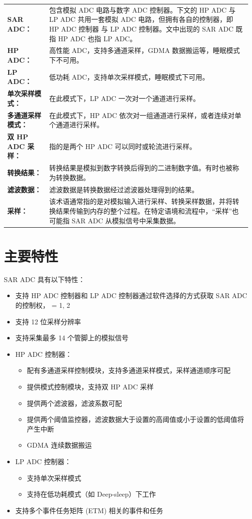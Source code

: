 \documentclass[main\_\_CN.tex]{subfiles}
\begin{document}
\begin{longtable}{ R{4cm} p{11cm} }
\textbf{SAR ADC：} & 包含模拟 ADC 电路与数字 ADC 控制器。下文的 HP ADC 与 LP ADC 共用一套模拟 ADC 电路，但拥有各自的控制器，即 HP ADC 控制器 与 LP ADC 控制器。文中出现的 SAR ADC 既指 HP ADC 也指 LP ADC。\\
\textbf{HP ADC：} & 高性能 ADC，支持多通道采样，GDMA 数据搬运等，睡眠模式下不可用。\\
\textbf{LP ADC：} & 低功耗 ADC，支持单次采样模式，睡眠模式下可用。\\
\textbf{单次采样模式：} & 在此模式下，LP ADC 一次对一个通道进行采样。 \\
\textbf{多通道采样模式：} & 在此模式下，HP ADC 依次对一组通道进行采样，或者连续对单个通道进行采样。\\
\textbf{双 HP ADC 采样：} & 指的是两个 HP ADC 可以同时或轮流进行采样。 \\
\textbf{转换结果：} & 转换结果是模拟到数字转换后得到的二进制数字值。有时也被称为转换数据。\\
\textbf{滤波数据：} & 滤波数据是转换数据经过滤波器处理得到的结果。 \\
\textbf{采样：} & 该术语通常指的是对模拟输入进行采样、转换采样数据，并将转换结果传输到内存的整个过程。在特定语境和流程中，“采样”也可能指 SAR ADC 从模拟信号中采集数据。\\
\end{longtable}

\section{主要特性}
SAR ADC 具有以下特性：

\begin{itemize}
\item 支持 HP ADC 控制器和 LP ADC 控制器通过软件选择的方式获取 SAR ADC 的控制权， = 1, 2
\item 支持 12 位采样分辨率
\item 支持采集最多 14 个管脚上的模拟信号
\item HP ADC 控制器：
    \begin{itemize}
        \item 配有多通道采样控制模块，支持多通道采样模式，采样通道顺序可配
        \item 提供模式控制模块，支持双 HP ADC 采样
        \item 提供两个滤波器，滤波系数可配
        \item 提供两个阈值监控器，滤波数据大于设置的高阈值或小于设置的低阈值将产生中断
        \item GDMA 连续数据搬运
    \end{itemize}
\item{LP ADC 控制器：}
    \begin{itemize}
        \item 支持单次采样模式
        \item 支持在低功耗模式（如 Deep-sleep）下工作
    \end{itemize}
\item 支持多个事件任务矩阵 (ETM) 相关的事件和任务
\end{itemize}
\end{document}
